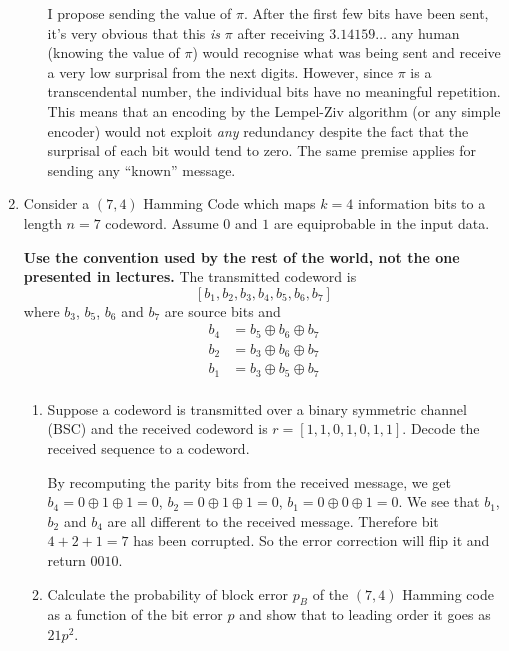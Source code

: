 \documentclass[10pt,\jkfside,a4paper]{article}
\begin{document}
\begin{enumerate}
\begin{enumerate}
        I propose sending the value of $\pi$. After the first few bits have been sent, it's very obvious that this \emph{is} $\pi$ \ie after receiving $3.14159\ldots$ any human (knowing the value of $\pi$) would recognise what was being sent and receive a very low surprisal from the next digits. However, since $\pi$ is a transcendental number, the individual bits have no meaningful repetition. This means that an encoding by the Lempel-Ziv algorithm (or any simple encoder) would not exploit \emph{any} redundancy despite the fact that the surprisal of each bit would tend to zero. The same premise applies for sending any ``known'' message.

    \end{enumerate}

    \item Consider a $(7, 4)$ Hamming Code which maps $k = 4$ information bits to a length $n = 7$ codeword. Assume $0$ and $1$ are equiprobable in the input data.

    \textbf{Use the convention used by the rest of the world, not the one presented in lectures.} The transmitted codeword is
    \[
        [b_1, b_2, b_3, b_4, b_5, b_6, b_7]
    \]
    where $b_3$, $b_5$, $b_6$ and $b_7$ are source bits and
    \begin{align*}
        b_4 &= b_5 \oplus b_6 \oplus b_7 \\
        b_2 &= b_3 \oplus b_6 \oplus b_7 \\
        b_1 &= b_3 \oplus b_5 \oplus b_7 \\
    \end{align*}

    \begin{enumerate}

        \item Suppose a codeword is transmitted over a binary symmetric channel (BSC) and the received codeword is $r = [1, 1, 0, 1, 0, 1, 1]$. Decode the received sequence to a codeword.

        By recomputing the parity bits from the received message, we get $b_4 = 0 \oplus 1 \oplus 1 = 0$, $b_2 = 0 \oplus 1 \oplus 1 = 0$, $b_1 = 0 \oplus 0 \oplus 1 = 0$. We see that $b_1$, $b_2$ and $b_4$ are
        all different to the received message. Therefore bit $4 + 2 + 1 = 7$ has been corrupted. So the error correction will flip it and return $0010$.

        \item Calculate the probability of block error $p_B$ of the $(7, 4)$ Hamming code as a function of the bit error $p$ and show that to leading order it goes as $21p^2$.


\end{enumerate}
\end{enumerate}
\end{document}
